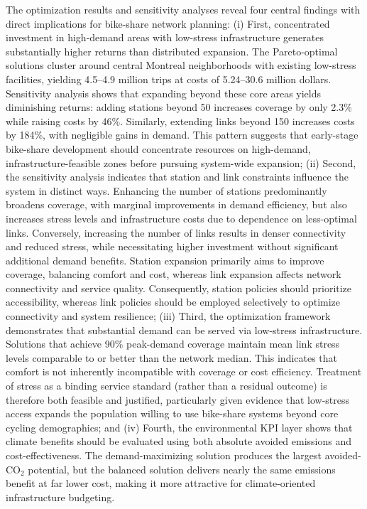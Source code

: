 \documentclass[preprint,authoryear,10pt]{elsarticle}
\begin{document}
The optimization results and sensitivity analyses reveal four central findings with direct implications for bike-share network planning: (i) First, concentrated investment in high-demand areas with low-stress infrastructure generates substantially higher returns than distributed expansion. The Pareto-optimal solutions cluster around central Montreal neighborhoods with existing low-stress facilities, yielding 4.5--4.9 million trips at costs of 5.24--30.6 million dollars. Sensitivity analysis shows that expanding beyond these core areas yields diminishing returns: adding stations beyond 50 increases coverage by only 2.3\% while raising costs by 46\%. Similarly, extending links beyond 150 increases costs by 184\%, with negligible gains in demand. This pattern suggests that early-stage bike-share development should concentrate resources on high-demand, infrastructure-feasible zones before pursuing system-wide expansion; (ii) Second, the sensitivity analysis indicates that station and link constraints influence the system in distinct ways. Enhancing the number of stations predominantly broadens coverage, with marginal improvements in demand efficiency, but also increases stress levels and infrastructure costs due to dependence on less-optimal links. Conversely, increasing the number of links results in denser connectivity and reduced stress, while necessitating higher investment without significant additional demand benefits. Station expansion primarily aims to improve coverage, balancing comfort and cost, whereas link expansion affects network connectivity and service quality. Consequently, station policies should prioritize accessibility, whereas link policies should be employed selectively to optimize connectivity and system resilience; (iii) Third, the optimization framework demonstrates that substantial demand can be served via low-stress infrastructure. Solutions that achieve 90\% peak-demand coverage maintain mean link stress levels comparable to or better than the network median. This indicates that comfort is not inherently incompatible with coverage or cost efficiency. Treatment of stress as a binding service standard (rather than a residual outcome) is therefore both feasible and justified, particularly given evidence that low-stress access expands the population willing to use bike-share systems beyond core cycling demographics; and (iv) Fourth, the environmental KPI layer shows that climate benefits should be evaluated using both absolute avoided emissions and cost-effectiveness. The demand-maximizing solution produces the largest avoided-CO$_2$ potential, but the balanced solution delivers nearly the same emissions benefit at far lower cost, making it more attractive for climate-oriented infrastructure budgeting.
\end{document}
